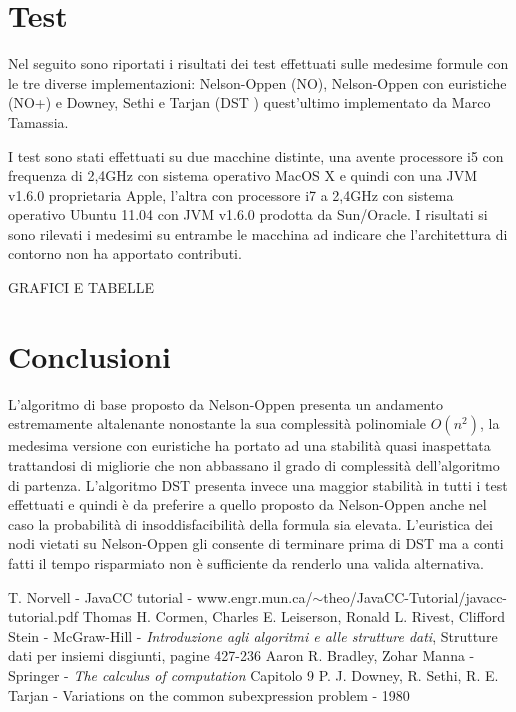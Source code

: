 \documentclass[a4paper,11pt]{article}
\begin{document}
\section{Test}
Nel seguito sono riportati i risultati dei test effettuati sulle medesime formule con le tre diverse implementazioni: Nelson-Oppen (NO), Nelson-Oppen con euristiche (NO+) e Downey, Sethi e Tarjan (DST ) quest'ultimo implementato da Marco Tamassia.


I test sono stati effettuati su due macchine distinte, una avente processore i5 con frequenza di 2,4GHz con sistema operativo MacOS X e quindi con una JVM v1.6.0 proprietaria Apple, l'altra con processore i7 a 2,4GHz con sistema operativo Ubuntu 11.04 con JVM v1.6.0 prodotta da Sun/Oracle.
I risultati si sono rilevati i medesimi su entrambe le macchina ad indicare che l'architettura di contorno non ha apportato contributi.

GRAFICI E TABELLE

\section{Conclusioni}
L'algoritmo di base proposto da Nelson-Oppen presenta un andamento estremamente altalenante nonostante la sua complessità polinomiale $O(n^2)$, la medesima versione con euristiche ha portato ad una stabilità quasi inaspettata trattandosi di migliorie che non abbassano il grado di complessità dell'algoritmo di partenza.
L'algoritmo DST presenta invece una maggior stabilità in tutti i test effettuati e quindi è da preferire a quello proposto da Nelson-Oppen anche nel caso la probabilità di insoddisfacibilità della formula sia elevata.
L'euristica dei nodi vietati su Nelson-Oppen gli consente di terminare prima di DST ma a conti fatti il tempo risparmiato non è sufficiente da renderlo una valida alternativa.


\begin{thebibliography}{1}
T. Norvell - JavaCC tutorial - www.engr.mun.ca/$\sim$theo/JavaCC-Tutorial/javacc-tutorial.pdf
Thomas H. Cormen, Charles E. Leiserson, Ronald L. Rivest, Clifford Stein - McGraw-Hill - \textit {Introduzione agli algoritmi e alle strutture dati}, Strutture dati per insiemi disgiunti, pagine 427-236
Aaron R. Bradley, Zohar Manna - Springer - \textit {The calculus of computation} Capitolo 9 
P. J. Downey, R. Sethi, R. E. Tarjan - Variations on the common subexpression problem - 1980
\end{thebibliography}
\end{document}
